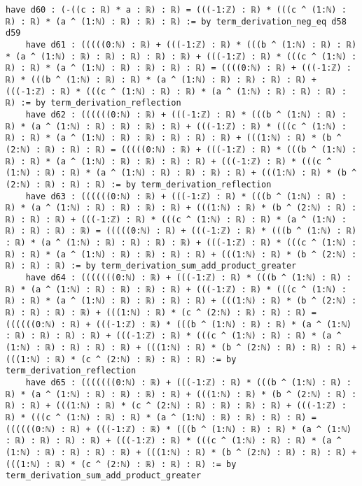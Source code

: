 \documentclass{article}
\begin{document}
\begin{tcolorbox}[colback=white!10, width=\linewidth]
\begin{lstlisting}[language=Lean4]
    have d60 : (-((c : ℝ) * a : ℝ) : ℝ) = (((-1:ℤ) : ℝ) * (((c ^ (1:ℕ) : ℝ) : ℝ) * (a ^ (1:ℕ) : ℝ) : ℝ) : ℝ) := by term_derivation_neg_eq d58 d59
    have d61 : (((((0:ℕ) : ℝ) + (((-1:ℤ) : ℝ) * (((b ^ (1:ℕ) : ℝ) : ℝ) * (a ^ (1:ℕ) : ℝ) : ℝ) : ℝ) : ℝ) : ℝ) + (((-1:ℤ) : ℝ) * (((c ^ (1:ℕ) : ℝ) : ℝ) * (a ^ (1:ℕ) : ℝ) : ℝ) : ℝ) : ℝ) = ((((0:ℕ) : ℝ) + (((-1:ℤ) : ℝ) * (((b ^ (1:ℕ) : ℝ) : ℝ) * (a ^ (1:ℕ) : ℝ) : ℝ) : ℝ) : ℝ) + (((-1:ℤ) : ℝ) * (((c ^ (1:ℕ) : ℝ) : ℝ) * (a ^ (1:ℕ) : ℝ) : ℝ) : ℝ) : ℝ) := by term_derivation_reflection
    have d62 : ((((((0:ℕ) : ℝ) + (((-1:ℤ) : ℝ) * (((b ^ (1:ℕ) : ℝ) : ℝ) * (a ^ (1:ℕ) : ℝ) : ℝ) : ℝ) : ℝ) + (((-1:ℤ) : ℝ) * (((c ^ (1:ℕ) : ℝ) : ℝ) * (a ^ (1:ℕ) : ℝ) : ℝ) : ℝ) : ℝ) : ℝ) + (((1:ℕ) : ℝ) * (b ^ (2:ℕ) : ℝ) : ℝ) : ℝ) = (((((0:ℕ) : ℝ) + (((-1:ℤ) : ℝ) * (((b ^ (1:ℕ) : ℝ) : ℝ) * (a ^ (1:ℕ) : ℝ) : ℝ) : ℝ) : ℝ) + (((-1:ℤ) : ℝ) * (((c ^ (1:ℕ) : ℝ) : ℝ) * (a ^ (1:ℕ) : ℝ) : ℝ) : ℝ) : ℝ) + (((1:ℕ) : ℝ) * (b ^ (2:ℕ) : ℝ) : ℝ) : ℝ) := by term_derivation_reflection
    have d63 : ((((((0:ℕ) : ℝ) + (((-1:ℤ) : ℝ) * (((b ^ (1:ℕ) : ℝ) : ℝ) * (a ^ (1:ℕ) : ℝ) : ℝ) : ℝ) : ℝ) + (((1:ℕ) : ℝ) * (b ^ (2:ℕ) : ℝ) : ℝ) : ℝ) : ℝ) + (((-1:ℤ) : ℝ) * (((c ^ (1:ℕ) : ℝ) : ℝ) * (a ^ (1:ℕ) : ℝ) : ℝ) : ℝ) : ℝ) = (((((0:ℕ) : ℝ) + (((-1:ℤ) : ℝ) * (((b ^ (1:ℕ) : ℝ) : ℝ) * (a ^ (1:ℕ) : ℝ) : ℝ) : ℝ) : ℝ) + (((-1:ℤ) : ℝ) * (((c ^ (1:ℕ) : ℝ) : ℝ) * (a ^ (1:ℕ) : ℝ) : ℝ) : ℝ) : ℝ) + (((1:ℕ) : ℝ) * (b ^ (2:ℕ) : ℝ) : ℝ) : ℝ) := by term_derivation_sum_add_product_greater
    have d64 : (((((((0:ℕ) : ℝ) + (((-1:ℤ) : ℝ) * (((b ^ (1:ℕ) : ℝ) : ℝ) * (a ^ (1:ℕ) : ℝ) : ℝ) : ℝ) : ℝ) + (((-1:ℤ) : ℝ) * (((c ^ (1:ℕ) : ℝ) : ℝ) * (a ^ (1:ℕ) : ℝ) : ℝ) : ℝ) : ℝ) + (((1:ℕ) : ℝ) * (b ^ (2:ℕ) : ℝ) : ℝ) : ℝ) : ℝ) + (((1:ℕ) : ℝ) * (c ^ (2:ℕ) : ℝ) : ℝ) : ℝ) = ((((((0:ℕ) : ℝ) + (((-1:ℤ) : ℝ) * (((b ^ (1:ℕ) : ℝ) : ℝ) * (a ^ (1:ℕ) : ℝ) : ℝ) : ℝ) : ℝ) + (((-1:ℤ) : ℝ) * (((c ^ (1:ℕ) : ℝ) : ℝ) * (a ^ (1:ℕ) : ℝ) : ℝ) : ℝ) : ℝ) + (((1:ℕ) : ℝ) * (b ^ (2:ℕ) : ℝ) : ℝ) : ℝ) + (((1:ℕ) : ℝ) * (c ^ (2:ℕ) : ℝ) : ℝ) : ℝ) := by term_derivation_reflection
    have d65 : (((((((0:ℕ) : ℝ) + (((-1:ℤ) : ℝ) * (((b ^ (1:ℕ) : ℝ) : ℝ) * (a ^ (1:ℕ) : ℝ) : ℝ) : ℝ) : ℝ) + (((1:ℕ) : ℝ) * (b ^ (2:ℕ) : ℝ) : ℝ) : ℝ) + (((1:ℕ) : ℝ) * (c ^ (2:ℕ) : ℝ) : ℝ) : ℝ) : ℝ) + (((-1:ℤ) : ℝ) * (((c ^ (1:ℕ) : ℝ) : ℝ) * (a ^ (1:ℕ) : ℝ) : ℝ) : ℝ) : ℝ) = ((((((0:ℕ) : ℝ) + (((-1:ℤ) : ℝ) * (((b ^ (1:ℕ) : ℝ) : ℝ) * (a ^ (1:ℕ) : ℝ) : ℝ) : ℝ) : ℝ) + (((-1:ℤ) : ℝ) * (((c ^ (1:ℕ) : ℝ) : ℝ) * (a ^ (1:ℕ) : ℝ) : ℝ) : ℝ) : ℝ) + (((1:ℕ) : ℝ) * (b ^ (2:ℕ) : ℝ) : ℝ) : ℝ) + (((1:ℕ) : ℝ) * (c ^ (2:ℕ) : ℝ) : ℝ) : ℝ) := by term_derivation_sum_add_product_greater

\end{lstlisting}
\end{tcolorbox}
\end{document}
